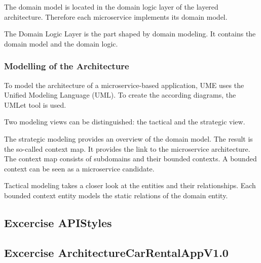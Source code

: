 The domain model is located in the domain logic layer of the layered architecture.
Therefore each microservice implements its domain model.

The Domain Logic Layer is the part shaped by domain modeling.
It contains the domain model and the domain logic.

\subsubsection*{Modelling of the Architecture}
To model the architecture of a microservice-based application, UME uses the Unified Modeling Language (UML).
To create the according diagrams, the UMLet tool is used.

Two modeling views can be distinguished: the tactical and the strategic view.

The strategic modeling provides an overview of the domain model.
The result is the so-called context map.
It provides the link to the microservice architecture.
The context map consists of subdomains and their bounded contexts.
A bounded context can be seen as a microservice candidate.

Tactical modeling takes a closer look at the entities and their relationships.
Each bounded context entity models the static relations of the domain entity.

\subsection{Excercise APIStyles}
\label{sec:api_styles}


\subsection{Excercise ArchitectureCarRentalAppV1.0}
\label{sec:architecture_car_rental_app_v1_0}
